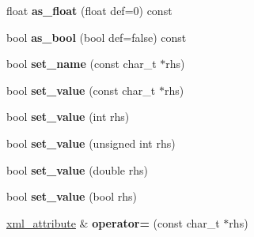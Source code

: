 \begin{DoxyCompactItemize}
\item 
\hypertarget{classpugi_1_1xml__attribute_a23f960683dba03f32ed4da19a10c769d}{float {\bfseries as\-\_\-float} (float def=0) const }\label{classpugi_1_1xml__attribute_a23f960683dba03f32ed4da19a10c769d}

\item 
\hypertarget{classpugi_1_1xml__attribute_a715646ddcfcd9f327934f9083f949796}{bool {\bfseries as\-\_\-bool} (bool def=false) const }\label{classpugi_1_1xml__attribute_a715646ddcfcd9f327934f9083f949796}

\item 
\hypertarget{classpugi_1_1xml__attribute_ae8ffb5ef48338f27015337a6f57b6595}{bool {\bfseries set\-\_\-name} (const char\-\_\-t $\ast$rhs)}\label{classpugi_1_1xml__attribute_ae8ffb5ef48338f27015337a6f57b6595}

\item 
\hypertarget{classpugi_1_1xml__attribute_af2ca1f0d13ee8f661bc17524bedc13d7}{bool {\bfseries set\-\_\-value} (const char\-\_\-t $\ast$rhs)}\label{classpugi_1_1xml__attribute_af2ca1f0d13ee8f661bc17524bedc13d7}

\item 
\hypertarget{classpugi_1_1xml__attribute_aa9fcffccebda6ae6169e4d17265bd39a}{bool {\bfseries set\-\_\-value} (int rhs)}\label{classpugi_1_1xml__attribute_aa9fcffccebda6ae6169e4d17265bd39a}

\item 
\hypertarget{classpugi_1_1xml__attribute_abffdc566e5e2805c493f18f8424f5024}{bool {\bfseries set\-\_\-value} (unsigned int rhs)}\label{classpugi_1_1xml__attribute_abffdc566e5e2805c493f18f8424f5024}

\item 
\hypertarget{classpugi_1_1xml__attribute_a5e58f7565792ba3afd432325f824f1b3}{bool {\bfseries set\-\_\-value} (double rhs)}\label{classpugi_1_1xml__attribute_a5e58f7565792ba3afd432325f824f1b3}

\item 
\hypertarget{classpugi_1_1xml__attribute_a33ab85a706a18f88241081ab8b0f823f}{bool {\bfseries set\-\_\-value} (bool rhs)}\label{classpugi_1_1xml__attribute_a33ab85a706a18f88241081ab8b0f823f}

\item 
\hypertarget{classpugi_1_1xml__attribute_a957f7613ba25623fa3bdf1c50346b869}{\hyperlink{classpugi_1_1xml__attribute}{xml\-\_\-attribute} \& {\bfseries operator=} (const char\-\_\-t $\ast$rhs)}\label{classpugi_1_1xml__attribute_a957f7613ba25623fa3bdf1c50346b869}


\end{DoxyCompactItemize}
